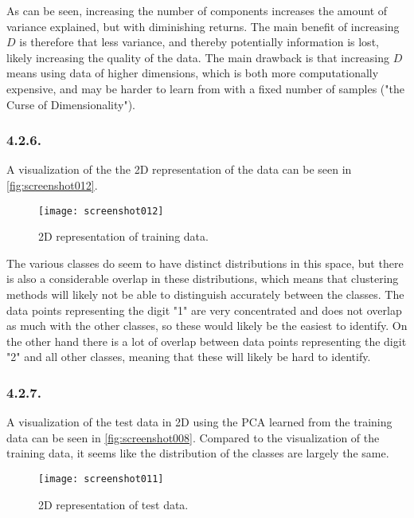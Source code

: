 \documentclass[a4paper, 12pt]{article}
\begin{document}
As can be seen, increasing the number of components increases the amount of variance explained, but with diminishing returns. The main benefit of increasing $D$ is therefore that less variance, and thereby potentially information is lost, likely increasing the quality of the data. The main drawback is that increasing $D$ means using data of higher dimensions, which is both more computationally expensive, and may be harder to learn from with a fixed number of samples ("the Curse of Dimensionality").

\subsubsection{4.2.6.}

A visualization of the the 2D representation of the data can be seen in \autoref{fig:screenshot012}.

\begin{figure}[H]
	\centering
	\texttt{[image: screenshot012]}
	\caption{2D representation of training data.}
	\label{fig:screenshot012}
\end{figure}


The various classes do seem to have distinct distributions in this space, but there is also a considerable overlap in these distributions, which means that clustering methods will likely not be able to distinguish accurately between the classes. The data points representing the digit "1" are very concentrated and does not overlap as much with the other classes, so these would likely be the easiest to identify. On the other hand there is a lot of overlap between data points representing the digit "2" and all other classes, meaning that these will likely be hard to identify.

\subsubsection{4.2.7.}

A visualization of the test data in 2D using the PCA learned from the training data can be seen in \autoref{fig:screenshot008}. Compared to the visualization of the training data, it seems like the distribution of the classes are largely the same.

\begin{figure}[H]
	\centering
	\texttt{[image: screenshot011]}
	\caption{2D representation of test data.}
	\label{fig:screenshot008}
\end{figure}
\end{document}
